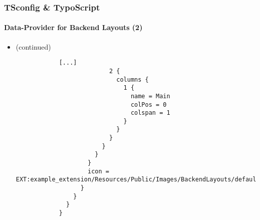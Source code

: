 \begin{frame}[fragile]
	\frametitle{TSconfig \& TypoScript}
	\framesubtitle{Data-Provider for Backend Layouts (2)}

	\lstset{basicstyle=\tiny\ttfamily}

	\begin{itemize}
		\item \smaller(continued)\normalsize
		\begin{lstlisting}
			[...]
			              2 {
			                columns {
			                  1 {
			                    name = Main
			                    colPos = 0
			                    colspan = 1
			                  }
			                }
			              }
			            }
			          }
			        }
			        icon = EXT:example_extension/Resources/Public/Images/BackendLayouts/default.gif
			      }
			    }
			  }
			}
		\end{lstlisting}
	\end{itemize}

\end{frame}


